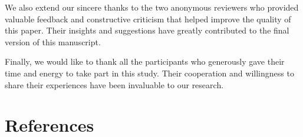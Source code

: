 \documentclass{article}
\begin{document}
We also extend our sincere thanks to the two anonymous reviewers who provided valuable feedback and constructive criticism that helped improve the quality of this paper. Their insights and suggestions have greatly contributed to the final version of this manuscript.

Finally, we would like to thank all the participants who generously gave their time and energy to take part in this study. Their cooperation and willingness to share their experiences have been invaluable to our research.

\maketitle

\section{References}
\end{document}
